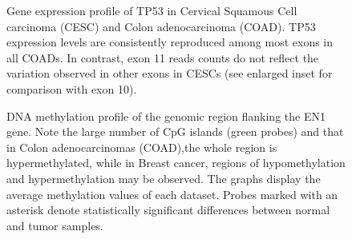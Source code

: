 \documentclass{bmcart}
\begin{document}
\begin{backmatter}
\begin{figure}[h!]
  \caption{
 Gene expression profile of TP53 in Cervical Squamous Cell carcinoma (CESC) and Colon adenocarcinoma (COAD). TP53 expression levels are consistently reproduced among most exons in all COADs. In contrast, exon 11 reads counts do not reflect the variation observed in other exons in CESCs (see enlarged inset for comparison with exon 10).
  }
  \label{fig:3}
\end{figure}

\begin{figure}[h!]
  \caption{
DNA methylation profile of the genomic region flanking the EN1 gene. Note the large number of CpG islands (green probes) and that in Colon  adenocarcinomas (COAD),the whole region is hypermethylated, while in Breast cancer,  regions of hypomethylation and hypermethylation may be observed. The graphs display the average methylation values of each dataset. Probes marked with an asterisk denote statistically significant differences between normal and tumor samples.
  }
  \label{fig:4}
\end{figure}





\end{backmatter}
\end{document}
